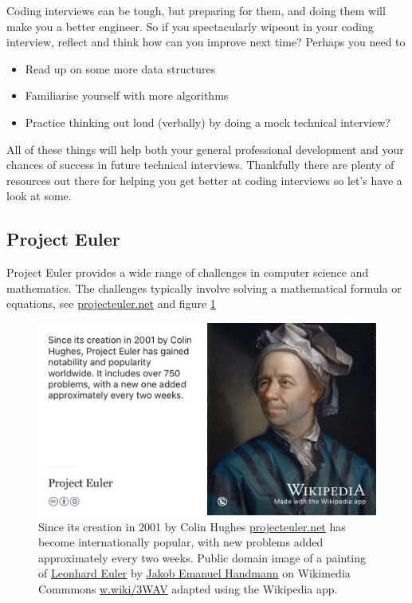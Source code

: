 \documentclass[
]{book}
\providecommand{\tightlist}{%
  \setlength{\itemsep}{0pt}\setlength{\parskip}{0pt}}
\begin{document}
Coding interviews can be tough, but preparing for them, and doing them will make you a better engineer. So if you spectacularly wipeout in your coding interview, reflect and think how can you improve next time? Perhaps you need to

\begin{itemize}
\tightlist
\item
  Read up on some more data structures
\item
  Familiarise yourself with more algorithms
\item
  Practice thinking out loud (verbally) by doing a mock technical interview?
\end{itemize}

All of these things will help both your general professional development and your chances of success in future technical interviews. Thankfully there are plenty of resources out there for helping you get better at coding interviews so let's have a look at some.

\hypertarget{euler}{%
\subsection{Project Euler}\label{euler}}

Project Euler provides a wide range of challenges in computer science and mathematics. The challenges typically involve solving a mathematical formula or equations, see \href{https://projecteuler.net/}{projecteuler.net} and figure \ref{fig:euler-fig}

\begin{figure}

{\centering \includegraphics[width=0.99\linewidth]{images/project-euler} 

}

\caption{Since its creation in 2001 by Colin Hughes \href{https://projecteuler.net/}{projecteuler.net} has become internationally popular, with new problems added approximately every two weeks. \citep{colinhughes} Public domain image of a painting of \href{https://en.wikipedia.org/wiki/Leonhard_Euler}{Leonhard Euler} by \href{https://en.wikipedia.org/wiki/Jakob_Emanuel_Handmann}{Jakob Emanuel Handmann} on Wikimedia Commmons \href{https://w.wiki/3WAV}{w.wiki/3WAV} adapted using the Wikipedia app.}\label{fig:euler-fig}
\end{figure}
\end{document}
